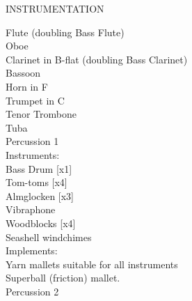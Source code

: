 \documentclass[11pt]{article}
\begin{document}
\endgroup

\vspace*{8\baselineskip}

\begin{center}
\huge INSTRUMENTATION
\end{center}

\hspace*{1cm} Flute (doubling Bass Flute)
\\
\hspace*{1cm} Oboe
\\
\hspace*{1cm} Clarinet in B-flat (doubling Bass Clarinet)
\\
\hspace*{1cm} Bassoon
\\
\hspace*{1cm} Horn in F
\\
\hspace*{1cm} Trumpet in C
\\
\hspace*{1cm} Tenor Trombone
\\
\hspace*{1cm} Tuba
\\
\hspace*{1cm} Percussion 1
\\
\hspace*{2cm} Instruments:
\\
\hspace*{3cm} Bass Drum [x1]
\\
\hspace*{3cm} Tom-toms [x4]
\\
\hspace*{3cm} Almglocken [x3]
\\
\hspace*{3cm} Vibraphone
\\
\hspace*{3cm} Woodblocks [x4]
\\
\hspace*{3cm} Seashell windchimes
\\
\hspace*{2cm} Implements:
\\
\hspace*{3cm} Yarn mallets suitable for all instruments
\\
\hspace*{3cm} Superball (friction) mallet.
\\
\hspace*{1cm} Percussion 2
\\
\end{document}
